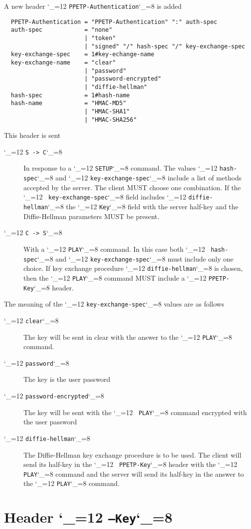 \documentclass{rfc}
\def\ttt{\catcode`\_=12 \tttii}
\def\tttii#1!{{\tt #1}\catcode`\_=8{}}
\begin{document}
A new header \ttt PPETP-Authentication! is added

\begin{verbatim}
  PPETP-Authentication = "PPETP-Authentication" ":" auth-spec
  auth-spec            = "none"
                       | "token"
                       | "signed" "/" hash-spec "/" key-exchange-spec
  key-exchange-spec    = 1#key-echange-name
  key-exchange-name    = "clear"
                       | "password"
                       | "password-encrypted"
                       | "diffie-hellman"
  hash-spec            = 1#hash-name
  hash-name            = "HMAC-MD5"
                       | "HMAC-SHA1"
                       | "HMAC-SHA256"
\end{verbatim}

This header is sent 
\begin{description}
\item[\ttt S -> C!]
In response to a \ttt SETUP! command.  The values \ttt hash-spec! and
\ttt key-exchange-spec! include a list of methods accepted by the
server.  The client MUST choose one combination.   If the \ttt
key-exchange-spec! field includes \ttt diffie-hellman! the \ttt Key!
field with the server half-key and the Diffie-Hellman parameters MUST
be present.
\item[\ttt C -> S!]  With a \ttt PLAY! command.  In this case both \ttt
hash-spec! and \ttt key-exchange-spec! must include only one
choice. If key exchange procedure \ttt diffie-hellman! is chosen, then
the \ttt PLAY! command MUST include a \ttt PPETP-Key! header.
\end{description}
%
The meaning of the \ttt key-exchange-spec! values are as follows

\begin{description}
\item[\ttt clear!] The key will be sent in clear with the answer to
  the \ttt PLAY! command.
\item[\ttt password!] The key is the user password
\item[\ttt password-encrypted!] The key will be sent with the \ttt
  PLAY! command encrypted with the user password
\item[\ttt diffie-hellman!] The Diffie-Hellman key exchange procedure
  is to be used.  The client will send its half-key in the \ttt
  PPETP-Key!  header with the \ttt PLAY! command and the server will
  send its half-key in the answer to the \ttt PLAY! command.
\end{description}
%
\section{Header \protect\ttt \ppetp--Key!}
\label{sect:3.1;transport_layer}
\end{document}
